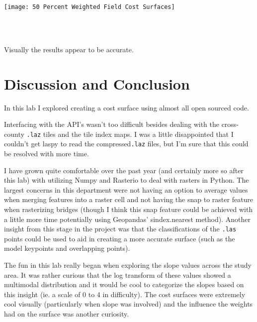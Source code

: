 \documentclass[article,12pt]{article}
\numberwithin{equation}{section}
\begin{document}
\begin{adjustwidth}{-.8in}{-.8in}
\begin{center}
{\begin{minipage}{.72\linewidth}
\begin{center}
\begin{minipage}{\linewidth}
					\texttt{[image: 50 Percent Weighted Field Cost Surfaces]}
				\end{minipage}
			\end{center}
		\end{minipage}
	}\\
	\\
\end{center}
\end{adjustwidth}

Visually the results appear to be accurate.

\section{Discussion and Conclusion}

In this lab I explored creating a cost surface using almost all open sourced code. 

Interfacing with the API's wasn't too difficult besides dealing with the cross-county \texttt{.laz} tiles and the tile index maps. I was a little disappointed that I couldn't get laspy to read the compressed\texttt{.laz} files, but I'm sure that this could be resolved with more time.

I have grown quite comfortable over the past year (and certainly more so after this lab) with utilizing Numpy and Rasterio to deal with rasters in Python. The largest concerns in this department were not having an option to average values when merging features into a raster cell and not having the snap to raster feature when rasterizing bridges (though I think this snap feature could be achieved with a little more time potentially using Geopandas' sindex.nearest method). Another insight from this stage in the project was that the classifications of the \texttt{.las} points could be used to aid in creating a more accurate surface (such as the model keypoints and overlapping points).

The fun in this lab really began when exploring the slope values across the study area. It was rather curious that the log transform of these values showed a multimodal distribution and it would be cool to categorize the slopes based on this insight (ie. a scale of 0 to 4 in difficulty). The cost surfaces were extremely cool visually (particularly when slope was involved) and the influence the weights had on the surface was another curiosity.
\end{document}

